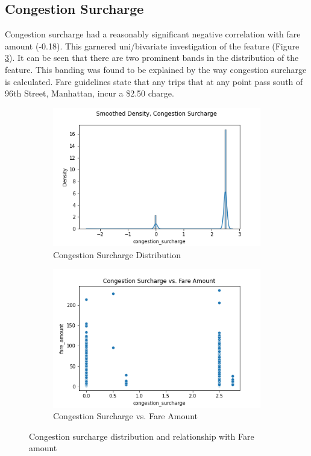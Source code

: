 \documentclass[11pt]{article}
\begin{document}
\subsection{Congestion Surcharge}
Congestion surcharge had a reasonably significant negative correlation with fare amount (-0.18). This garnered uni/bivariate investigation of the feature (Figure \ref{fig:congeston}). It can be seen that there are two prominent bands  in the distribution of the feature. This banding was found to be explained by the way congestion surcharge is calculated. Fare guidelines state that any trips that at any point pass south of 96th Street, Manhattan, incur a \$2.50 charge\cite{nycfarepage}.


\begin{figure}[h]
     \centering
     \begin{subfigure}[b]{0.45\textwidth}
         \centering
         \includegraphics[width=\textwidth]{congestion_surcharge_density.png}
         \caption{Congestion Surcharge Distribution}
         \label{fig:y equals x}
     \end{subfigure}
     \hfill
     \begin{subfigure}[b]{0.45\textwidth}
         \centering
         \includegraphics[width=\textwidth]{con_vs_fare.png}
         \caption{Congestion Surcharge vs. Fare Amount}
         \label{fig:three sin x}
     \end{subfigure}
        \caption{Congestion surcharge distribution and relationship with Fare amount}
        \label{fig:congeston}
\end{figure}
\end{document}
